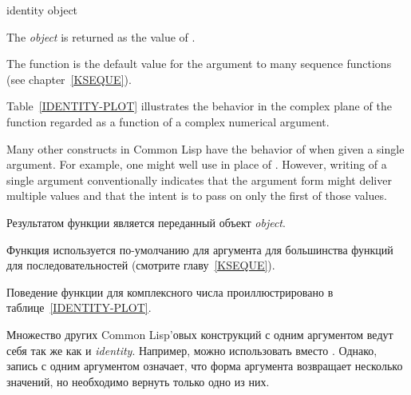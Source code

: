 \begin{defun}[Function]
identity object

The \emph{object} is returned as the value of .

The  function is the default value for the 
argument to many sequence functions (see chapter~\ref{KSEQUE}).

Table~\ref{IDENTITY-PLOT} illustrates the behavior in the complex plane
of the
 function regarded as a function of a complex numerical argument.

Many other constructs in Common Lisp have the behavior of 
when given a single argument.  For example, one might well use 
in place of .  However, writing  of a single
argument conventionally indicates that the argument form might deliver
multiple values and that the intent is to pass on only the first of
those values.

Результатом функции является переданный объект \emph{object}.

Функция  используется по-умолчанию для аргумента  для
большинства функций для последовательностей (смотрите главу~\ref{KSEQUE}).

Поведение функции  для комплексного числа проиллюстрировано в
таблице~\ref{IDENTITY-PLOT}.

Множество других Common Lisp'овых конструкций с одним аргументом ведут себя так
же как и \emph{identity}. Например, можно использовать  вместо
. Однако, запись  с одним аргументом означает, что
форма аргумента возвращает несколько значений, но необходимо вернуть только одно
из них.
\end{defun}
